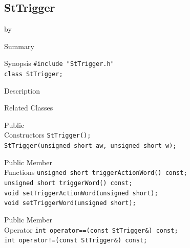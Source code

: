 \documentclass[twoside]{article}
\newcommand{\entrylabel}[1]{\mbox{\textbf{{#1}}}\hfil}%
\newenvironment{entry}
{\begin{list}{}%
    {\renewcommand{\makelabel}{\entrylabel}%
     \setlength{\labelwidth}{90pt}%
     \setlength{\leftmargin}{\labelwidth}
     \advance\leftmargin by \labelsep%
      }%
    }%
  {\end{list}}
\newcommand{\Entrylabel}[1]%
{\raisebox{0pt}[1ex][0pt]{\makebox[\labelwidth][l]%
    {\parbox[t]{\labelwidth}{\hspace{0pt}\textbf{{#1}}}}}}
\newenvironment{Entry}%
{\renewcommand{\entrylabel}{\Entrylabel}\begin{entry}}%
  {\end{entry}}
\begin{document}
\subsection{StTrigger}
\label{sec:StTrigger}
\begin{Entry}
\item[Summary]
\item[Synopsis]
    \verb+#include "StTrigger.h"+\\
    \verb+class StTrigger;+\\
\item[Description]
\item[Related Classes]
\item[Public\\ Constructors]
    \verb+StTrigger();+\\
    \verb+StTrigger(unsigned short aw, unsigned short w);+\\
\item[Public Member\\ Functions]
    \verb+unsigned short triggerActionWord() const;+\\
    \verb+unsigned short triggerWord() const;+\\
    \verb+void setTriggerActionWord(unsigned short);+\\
    \verb+void setTriggerWord(unsigned short);+\\
\item[Public Member\\ Operator]
    \verb+int operator==(const StTrigger&) const;+\\
    \verb+int operator!=(const StTrigger&) const;+\\
 \end{Entry}
 \clearpage
\end{document}
